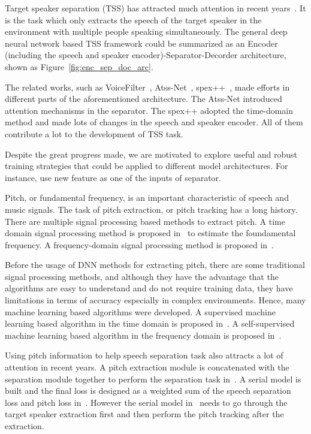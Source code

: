 \documentclass[
]{article}
\begin{document}
    Target speaker separation (TSS) has attracted much attention in recent years~\cite{speakerBeam, compact_speakerbeam, voicefilter, li20p_interspeech, time_domain_speaker_ex_net, spex, spex+, speakerfilter, speakerfilter_pro}.
    It is the task which only extracts the speech of the target speaker in the environment with multiple people speaking simultaneously.
    The general deep neural network based TSS framework could be summarized as an Encoder (including the speech and speaker encoder)-Separator-Decorder architecture, shown as Figure~\ref{fig:enc_sep_doc_arc}.

    The related works, such as VoiceFilter~\cite{voicefilter}, Atss-Net~\cite{li20p_interspeech}, spex++~\cite{time_domain_speaker_ex_net, spex, spex+}, made efforts in different parts of the aforementioned architecture. The Atss-Net introduced attention mechanisms in the separator. The spex++ adopted the time-domain method and made lots of changes in the speech and speaker encoder. All of them contribute a lot to the development of TSS task.

    Despite the great progress made, we are motivated to explore useful and robust training strategies that could be applied to different model architectures. For instance, use new feature as one of the inputs of separator.

    Pitch, or fundamental frequency, is an important characteristic of speech and music signals.
    The task of pitch extraction, or pitch tracking has a long history. There are multiple signal processing based methods to extract pitch. A time domain signal processing method is proposed in~\cite{yin} to estimate the foundamental frequency.
    A frequency-domain signal processing method is proposed in~\cite{swipe}.

    Before the usage of DNN methods for extracting pitch, there are some traditional signal processing methods, and although they have the advantage that the algorithms are easy to understand and do not require training data, they have limitations in terms of accuracy especially in complex environments.
    Hence, many machine learning based algorithms were developed. A supervised machine learning based algorithm in the time domain is proposed in~\cite{crepe}.
    A self-supervised machine learning based algorithm in the frequency domain is proposed in~\cite{spice}.

    Using pitch information to help speech separation task also attracts a lot of attention in recent years.
    A pitch extraction module is concatenated with the separation module together to perform the separation task in~\cite{pitch_aware}.
    A serial model is built and the final loss is designed as a weighted sum of the speech separation loss and pitch loss in~\cite{serial}. However the serial model in~\cite{serial} needs to go through the target speaker extraction first and then perform the pitch tracking after the extraction.
\end{document}
